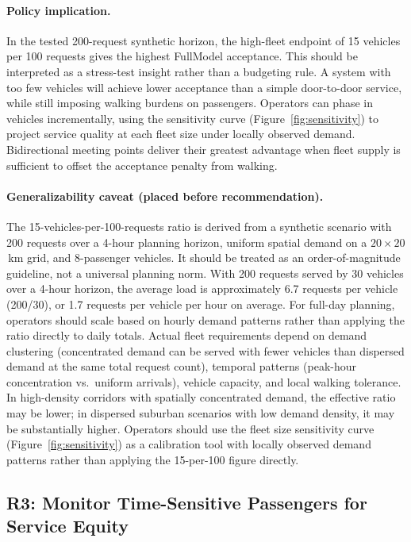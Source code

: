 \paragraph{Policy implication.}
In the tested 200-request synthetic horizon, the high-fleet endpoint of
15 vehicles per 100 requests gives the highest FullModel acceptance. This
should be interpreted as a stress-test insight rather than a budgeting rule.
A system with too few
vehicles will achieve lower acceptance than a simple door-to-door service,
while still imposing walking burdens on passengers. Operators can phase in
vehicles incrementally, using the sensitivity curve (Figure~\ref{fig:sensitivity})
to project service quality at each fleet size under locally observed demand.
Bidirectional meeting points deliver their greatest advantage when fleet supply
is sufficient to offset the acceptance penalty from walking.

\paragraph{Generalizability caveat (placed before recommendation).}
The 15-vehicles-per-100-requests ratio is derived from a synthetic
scenario with 200 requests over a 4-hour planning horizon, uniform
spatial demand on a $20 \times 20$\,km grid, and 8-passenger vehicles.
It should be treated as an order-of-magnitude guideline, not a universal planning norm.
With 200 requests served by 30 vehicles over a 4-hour horizon, the average
load is approximately 6.7 requests per vehicle (200/30), or 1.7 requests per
vehicle per hour on average. For full-day planning, operators should scale
based on hourly demand patterns rather than applying the ratio directly to daily totals.
Actual fleet requirements depend on demand clustering (concentrated demand can be
served with fewer vehicles than dispersed demand at the same total request count),
temporal patterns (peak-hour concentration vs.\ uniform arrivals), vehicle
capacity, and local walking tolerance.
In high-density corridors with spatially concentrated demand, the effective ratio
may be lower; in dispersed suburban scenarios with low demand density, it may be
substantially higher.
Operators should use the fleet size sensitivity curve (Figure~\ref{fig:sensitivity})
as a calibration tool with locally observed demand patterns rather than applying
the 15-per-100 figure directly.

\subsection{R3: Monitor Time-Sensitive Passengers for Service Equity}

